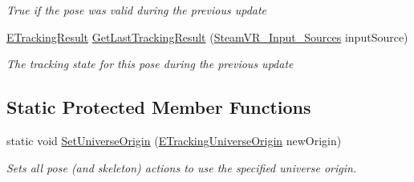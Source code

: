 \begin{DoxyCompactItemize}
\begin{DoxyCompactList}\small\item\em True if the pose was valid during the previous update \end{DoxyCompactList}\item 
\mbox{\hyperlink{namespace_valve_1_1_v_r_abe6feab98f33191b7c27b4292012e90a}{E\+Tracking\+Result}} \mbox{\hyperlink{class_valve_1_1_v_r_1_1_steam_v_r___action___pose___base_a3c4f99bc27df78ccb09f30f20503c20e}{Get\+Last\+Tracking\+Result}} (\mbox{\hyperlink{namespace_valve_1_1_v_r_a82e5bf501cc3aa155444ee3f0662853f}{Steam\+V\+R\+\_\+\+Input\+\_\+\+Sources}} input\+Source)
\begin{DoxyCompactList}\small\item\em The tracking state for this pose during the previous update \end{DoxyCompactList}\end{DoxyCompactItemize}
\subsection*{Static Protected Member Functions}
\begin{DoxyCompactItemize}
\item 
static void \mbox{\hyperlink{class_valve_1_1_v_r_1_1_steam_v_r___action___pose___base_a6fed3c51e6941259760bcd88bd17c2dc}{Set\+Universe\+Origin}} (\mbox{\hyperlink{namespace_valve_1_1_v_r_a29be99a3c2f780157bd490db06a7f12f}{E\+Tracking\+Universe\+Origin}} new\+Origin)
\begin{DoxyCompactList}\small\item\em Sets all pose (and skeleton) actions to use the specified universe origin. \end{DoxyCompactList}\end{DoxyCompactItemize}

